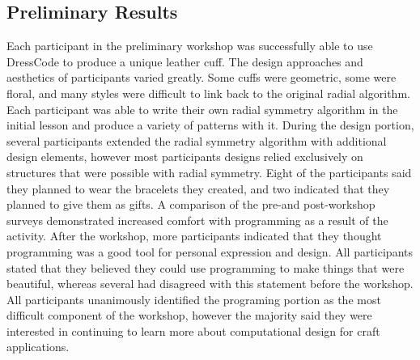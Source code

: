 \documentclass{sigchi}
\begin{document}
\subsection{Preliminary Results}
Each participant in the preliminary workshop was successfully able to use DressCode to produce a unique leather cuff. The design approaches and aesthetics of participants varied greatly. Some cuffs were geometric, some were floral, and many styles were difficult to link back to the original radial algorithm. Each participant was able to write their own radial symmetry algorithm in the initial lesson and produce a variety of patterns with it. During the design portion, several participants extended the radial symmetry algorithm with additional design elements, however most participants designs relied exclusively on structures that were possible with radial symmetry. Eight of the participants said they planned to wear the bracelets they created, and two indicated that they planned to give them as gifts. A comparison of the
pre-and post-workshop surveys demonstrated increased comfort with programming as a result of the activity. After the workshop, more participants indicated that they thought programming was a good tool for personal expression and design. All participants stated that they believed they could use programming to make things that were beautiful, whereas several had disagreed with this statement before the workshop. All participants unanimously identified the programing portion as the most difficult component of the workshop, however the majority said they were interested in continuing to learn more about computational design for craft applications. 
\end{document}
